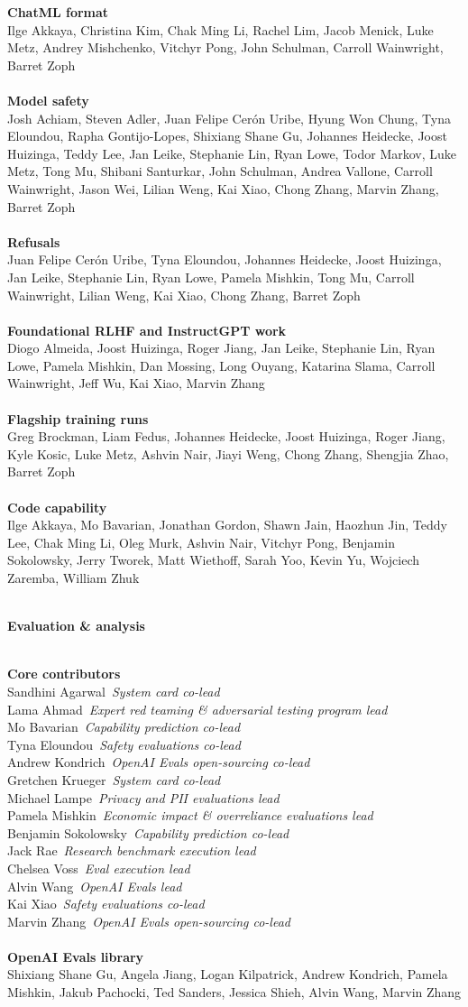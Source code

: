 \documentclass{article}
\newcommand{\creditsectionheader}[1]{\parbox{\columnwidth}{\centering \textbf{\small #1}}\\}
\newcommand{\creditlistheader}[1]{\textbf{#1}\footnotemark[\thefootnote]\\}
\newcommand{\creditlist}[2]{\creditlistheader{#1}#2\\
\\}
\newcommand{\corecontributor}[2]{#1\ \textit{#2}\\}
\begin{document}
\begin{multicols}{2}
\creditlist{ChatML format}{Ilge Akkaya, Christina Kim, Chak Ming Li, Rachel Lim, Jacob Menick, Luke Metz, Andrey Mishchenko, Vitchyr Pong, John Schulman, Carroll Wainwright, Barret Zoph}
\creditlist{Model safety}{Josh Achiam, Steven Adler, Juan Felipe Cer\'on Uribe, Hyung Won Chung, Tyna Eloundou, Rapha Gontijo-Lopes, Shixiang Shane Gu, Johannes Heidecke, Joost Huizinga, Teddy Lee, Jan Leike, Stephanie Lin, Ryan Lowe, Todor Markov, Luke Metz, Tong Mu, Shibani Santurkar, John Schulman, Andrea Vallone, Carroll Wainwright, Jason Wei, Lilian Weng, Kai Xiao, Chong Zhang, Marvin Zhang, Barret Zoph}
\creditlist{Refusals}{Juan Felipe Cer\'on Uribe, Tyna Eloundou, Johannes Heidecke, Joost Huizinga, Jan Leike, Stephanie Lin, Ryan Lowe, Pamela Mishkin, Tong Mu, Carroll Wainwright, Lilian Weng, Kai Xiao, Chong Zhang, Barret Zoph}
\creditlist{Foundational RLHF and InstructGPT work}{Diogo Almeida, Joost Huizinga, Roger Jiang, Jan Leike, Stephanie Lin, Ryan Lowe, Pamela Mishkin, Dan Mossing, Long Ouyang, Katarina Slama, Carroll Wainwright, Jeff Wu, Kai Xiao, Marvin Zhang}
\creditlist{Flagship training runs}{Greg Brockman, Liam Fedus, Johannes Heidecke, Joost Huizinga, Roger Jiang, Kyle Kosic, Luke Metz, Ashvin Nair, Jiayi Weng, Chong Zhang, Shengjia Zhao, Barret Zoph}
\creditlist{Code capability}{Ilge Akkaya, Mo Bavarian, Jonathan Gordon, Shawn Jain, Haozhun Jin, Teddy Lee, Chak Ming Li, Oleg Murk, Ashvin Nair, Vitchyr Pong, Benjamin Sokolowsky, Jerry Tworek, Matt Wiethoff, Sarah Yoo, Kevin Yu, Wojciech Zaremba, William Zhuk}
\creditsectionheader{Evaluation \& analysis}
\creditlistheader{Core contributors}
\corecontributor{Sandhini Agarwal}{System card co-lead}
\corecontributor{Lama Ahmad}{Expert red teaming \& adversarial testing program lead}
\corecontributor{Mo Bavarian}{Capability prediction co-lead}
\corecontributor{Tyna Eloundou}{Safety evaluations co-lead}
\corecontributor{Andrew Kondrich}{OpenAI Evals open-sourcing co-lead}
\corecontributor{Gretchen Krueger}{System card co-lead}
\corecontributor{Michael Lampe}{Privacy and PII evaluations lead}
\corecontributor{Pamela Mishkin}{Economic impact \& overreliance evaluations lead}
\corecontributor{Benjamin Sokolowsky}{Capability prediction co-lead}
\corecontributor{Jack Rae}{Research benchmark execution lead}
\corecontributor{Chelsea Voss}{Eval execution lead}
\corecontributor{Alvin Wang}{OpenAI Evals lead}
\corecontributor{Kai Xiao}{Safety evaluations co-lead}
\corecontributor{Marvin Zhang}{OpenAI Evals open-sourcing co-lead}
\\
\creditlist{OpenAI Evals library}{Shixiang Shane Gu, Angela Jiang, Logan Kilpatrick, Andrew Kondrich, Pamela Mishkin, Jakub Pachocki, Ted Sanders, Jessica Shieh, Alvin Wang, Marvin Zhang}

\end{multicols}
\end{document}
